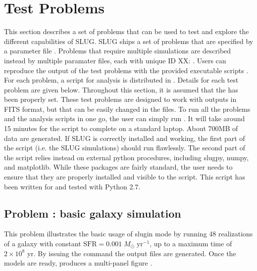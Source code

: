 \documentclass[letterpaper,10pt,english]{sphinxmanual}
\begin{document}
\chapter{Test Problems}
\label{\detokenize{tests:test-problems}}\label{\detokenize{tests::doc}}\label{\detokenize{tests:sec-tests}}
This section describes a set of problems that can be used to test and explore the different capabilities of SLUG. SLUG ships a
set of problems  that are specified by a parameter file . Problems that require
multiple simulations are described instead by multiple paramater files, each with unique ID XX:  .
Users can reproduce the output of the test problems with the provided executable scripts  .
For each problem, a script for analysis is distributed  in . Details for each test problem are given below. Throughout this section, it is assumed that the  has been properly set.
These test problems are designed to work with outputs in FITS format, but that can be easily changed in the
 files. To run all the problems and the analysis scripts in one go, the user can simply
run . It will take around 15 minutes
for the script to complete on a standard laptop. About 700MB of data are generated.
If SLUG is correctly installed and working, the first part of the script (i.e. the SLUG
simulations) should run flawlessly. The second part of the script relies instead on external python procedures,
including slugpy, numpy, and matplotlib. While these packages are fairly standard, the user needs to ensure that
they are properly installed and visible to the script. This script has been written for and tested with Python 2.7.


\section{Problem : basic galaxy simulation}
\label{\detokenize{tests:problem-example-galaxy-basic-galaxy-simulation}}
This problem illustrates the basic usage of slugin  mode by running 48 realizations of a galaxy with constant
\(\mathrm{SFR}=0.001\; M_\odot\;\mathrm{yr}^{-1}\), up to a maximum time of \(2\times 10^8\) yr. By issuing the
command  the output files  are generated. Once the models are ready,
 produces a multi-panel figure .
\end{document}
